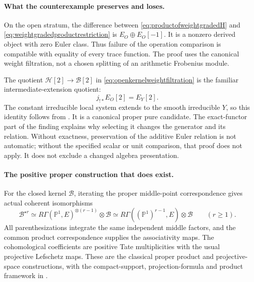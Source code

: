 \paragraph{What the counterexample preserves and loses.}
On the open stratum, the difference between
\eqref{eq:productofweightgradedH} and
\eqref{eq:weightgradedproductrestriction} is
\(E_O\oplus E_O[-1]\). It is a nonzero derived object with
zero Euler class. Thus failure of the operation comparison
is compatible with equality of every trace function. The
proof uses the canonical weight filtration, not a chosen
splitting of an arithmetic Frobenius module.

The quotient \(\mathcal H[2]\to\mathcal B[2]\) in
\eqref{eq:openkernelweightfiltration} is the familiar
intermediate-extension quotient:
\[
                        j_{!*}E_O[2]=E_Y[2].
\]
The constant irreducible local system extends to the smooth
irreducible \(Y\), so this identity follows from
\cite[Lemma~4.3.2 and proof, pp.~112--113]{BBD}.
It is a canonical proper pure candidate. The exact-functor
part of the finding explains why selecting it changes the
generator and its relation. Without exactness, preservation
of the additive Euler relation is not automatic; without
the specified scalar or unit comparison, that proof does
not apply. It does not exclude a changed algebra presentation.

\paragraph{The positive proper construction that does exist.}
For the closed kernel \(\mathcal B\), iterating the proper
middle-point correspondence gives actual coherent
isomorphisms
\begin{equation}\label{eq:properclosedkernelpowers}
 \mathcal B^{\star r}
   \simeq R\Gamma(\mathbb P^1,E)^{\otimes(r-1)}
                  \otimes\mathcal B
   \simeq R\Gamma((\mathbb P^1)^{r-1},E)
                  \otimes\mathcal B
       \qquad(r\ge1).
\end{equation}
All parenthesizations integrate the same independent middle
factors, and the common product correspondence supplies
the associativity maps. The cohomological coefficients
are positive Tate multiplicities with the usual projective
Lefschetz maps. These are the classical proper product and
projective-space constructions, with the compact-support,
projection-formula and product framework in
\cite[Theorem~17.10, pp.~116--117; Proposition~18.4,
pp.~121--122; Proposition~22.5, pp.~136--137;
\S23, pp.~138--140]{Milne}.

